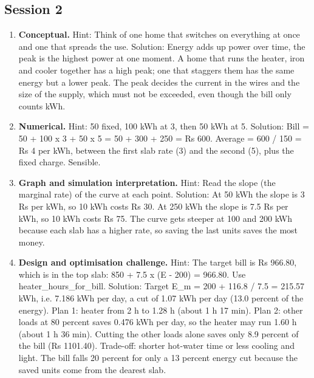 \documentclass[11pt,a4paper]{article}
\begin{document}
\subsection*{Session 2}
\begin{enumerate}[nosep]
\item \textbf{Conceptual.} Hint: Think of one home that switches on everything at once and one that spreads the use. Solution: Energy adds up power over time, the peak is the highest power at one moment. A home that runs the heater, iron and cooler together has a high peak; one that staggers them has the same energy but a lower peak. The peak decides the current in the wires and the size of the supply, which must not be exceeded, even though the bill only counts kWh.
\item \textbf{Numerical.} Hint: 50 fixed, 100 kWh at 3, then 50 kWh at 5. Solution: Bill = 50 + 100 x 3 + 50 x 5 = 50 + 300 + 250 = Rs 600. Average = 600 / 150 = Rs 4 per kWh, between the first slab rate (3) and the second (5), plus the fixed charge. Sensible.
\item \textbf{Graph and simulation interpretation.} Hint: Read the slope (the marginal rate) of the curve at each point. Solution: At 50 kWh the slope is 3 Rs per kWh, so 10 kWh costs Rs 30. At 250 kWh the slope is 7.5 Rs per kWh, so 10 kWh costs Rs 75. The curve gets steeper at 100 and 200 kWh because each slab has a higher rate, so saving the last units saves the most money.
\item \textbf{Design and optimisation challenge.} Hint: The target bill is Rs 966.80, which is in the top slab: 850 + 7.5 x (E - 200) = 966.80. Use heater\_hours\_for\_bill. Solution: Target E\_m = 200 + 116.8 / 7.5 = 215.57 kWh, i.e. 7.186 kWh per day, a cut of 1.07 kWh per day (13.0 percent of the energy). Plan 1: heater from 2 h to 1.28 h (about 1 h 17 min). Plan 2: other loads at 80 percent saves 0.476 kWh per day, so the heater may run 1.60 h (about 1 h 36 min). Cutting the other loads alone saves only 8.9 percent of the bill (Rs 1101.40). Trade-off: shorter hot-water time or less cooling and light. The bill falls 20 percent for only a 13 percent energy cut because the saved units come from the dearest slab.
\end{enumerate}
\end{document}
